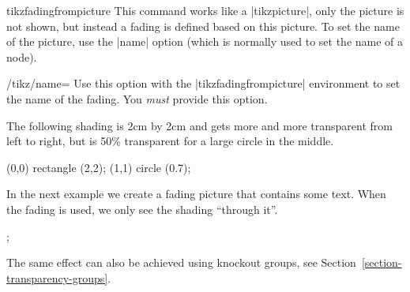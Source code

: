 \begin{environment}{{tikzfadingfrompicture}}
    This command works like a |{tikzpicture}|, only the picture is not shown,
    but instead a fading is defined based on this picture. To set the name of
    the picture, use the |name| option (which is normally used to set the name
    of a node).
    \begin{key}{/tikz/name=}
        Use this option with the |{tikzfadingfrompicture}| environment to set
        the name of the fading. You \emph{must} provide this option.
    \end{key}

    The following shading is 2cm by 2cm and gets more and more transparent from
    left to right, but is 50\% transparent for a large circle in the middle.
{\ifpgfmanualexternalize\tikzexternaldisable\fi
\begin{codeexample}[preamble={\usetikzlibrary{fadings,patterns}}]
\begin{tikzfadingfrompicture}[name=fade right with circle]
  \shade[left color=transparent!0,
         right color=transparent!100] (0,0) rectangle (2,2);
  \fill[transparent!50] (1,1) circle (0.7);
\end{tikzfadingfrompicture}

\end{codeexample}
    In the next example we create a fading picture that contains some text.
    When the fading is used, we only see the shading ``through it''.
\begin{codeexample}[preamble={\usetikzlibrary{fadings,patterns}}]
\begin{tikzfadingfrompicture}[name=tikz]
  ;
\end{tikzfadingfrompicture}

\end{codeexample}
}%

    The same effect can also be achieved using knockout groups, see
    Section~\ref{section-transparency-groups}.
\end{environment}

